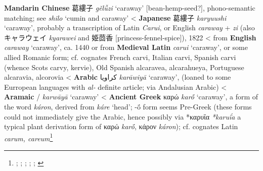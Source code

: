 \begin{etymology}\label{ety:geluzi}
\textbf{Mandarin Chinese} {葛縷子} \textit{gě​lǚ​zi} `caraway' [bean-hemp-seed?], phono-semantic matching; see \textit{shilo} `cumin and caraway'
< \textbf{Japanese} {葛縷子} \textit{karyuushi} `caraway', probably a transcription of Latin \textit{Carui}, or English \textit{caraway} + \textit{zi} (also キャラウェイ \textit{kyarawei} and 姫茴香 [princess-fennel-spice]), 1822
< from \textbf{English} \textit{caraway} `caraway', ca. 1440
 or from \textbf{Medieval Latin} \textit{carui} `caraway', or some allied Romanic form; cf. cognates French carvi, Italian carvi, Spanish carvi (whence Scots carvy, kervie), Old Spanish alcaravea, alcarahueya, Portuguese alcaravia, alcorovia
< \textbf{Arabic} {كراويا} \textit{karāwiyā} `caraway', (loaned to some Eurropean languages with \textit{al-} definite article; via Andalusian Arabic)
< \textbf{Aramaic} {/} \textit{karwāyā} `caraway'
< \textbf{Ancient Greek} {καρώ} \textit{karṓ} `caraway', a form of the word \textit{káron}, derived from \textit{káre} `head'; -ṓ form seems Pre-Greek (these forms could not immediately give the Arabic, hence possibly via *καρυΐα \textit{*karuḯa} a typical plant derivation form of καρώ \textit{karṓ}, κάρον \textit{káron}); cf. cognates Latin \textit{carum, careum}\footnote{\textcite[100]{kleeman_oxford_2010}; \textcite[s.v. caraway]{oed}; \textcite[s.v. caraway]{ahd}; \textcite[74]{corriente_dictionary_2008}; \textcites[207]{low_aramaeische_1881}[437-438]{low_flora_1924}; \textcites[653]{beekes_etymological_2010}[599]{sokoloff_dictionary_2002}}
\end{etymology}